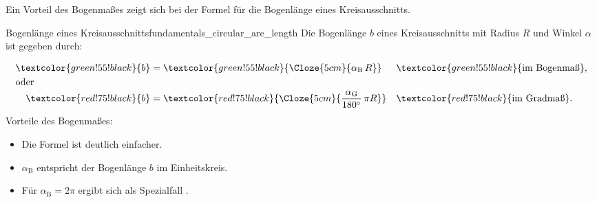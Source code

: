 Ein Vorteil des Bogenmaßes zeigt sich bei der Formel für die Bogenlänge eines
Kreisausschnitts.
\begin{KeyPointBox}{Bogenlänge eines Kreisausschnitts}{fundamentals_circular_arc_length}
  Die Bogenlänge $b$ eines Kreisausschnitts mit Radius $R$ und Winkel $\alpha$
  ist gegeben durch:
  \noindent
  \begin{minipage}[c]{0.59\linewidth}
    \begin{align*}
      \textcolor{green!55!black}{b}
        &= \textcolor{green!55!black}{\Cloze{5cm}{\alpha_{\mathrm B}\,R}}
        && \textcolor{green!55!black}{\text{im Bogenmaß}}, \\[-0.2em]
      \shortintertext{oder}
      \textcolor{red!75!black}{b}
        &= \textcolor{red!75!black}{
             \Cloze{5cm}{\frac{\alpha_{\mathrm G}}{180^\circ}\,\pi R}}
        && \textcolor{red!75!black}{\text{im Gradmaß}}.
    \end{align*}
    Vorteile des Bogenmaßes:
    \begin{itemize}
      \item Die Formel ist deutlich einfacher.
      \item $\alpha_{\mathrm B}$ entspricht der Bogenlänge $b$ im Einheitskreis.
      \item Für $\alpha_{\mathrm B}=2\pi$ ergibt sich als Spezialfall
        .
    \end{itemize}
  \end{minipage}\hfill
  \begin{minipage}[c]{0.36\linewidth}
    \centering
  \end{minipage}
\end{KeyPointBox}
